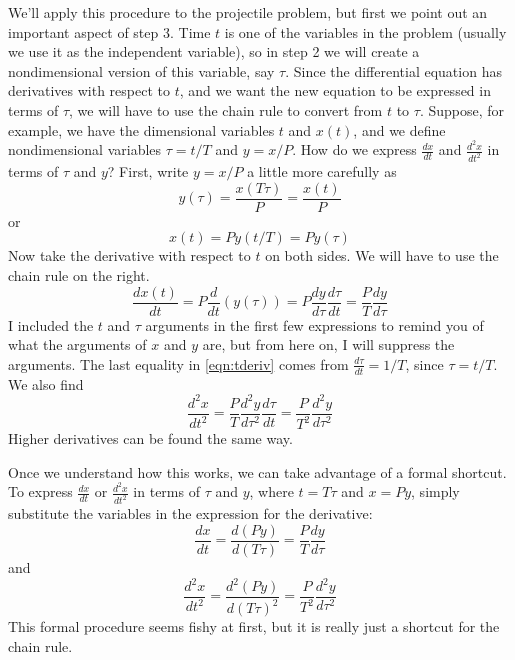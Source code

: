 We'll apply this procedure to the projectile problem,
but first we point out an important aspect of
step 3.
Time $t$ is one of the variables in the
problem (usually we use it as the independent
variable), so in step 2 we will create a nondimensional
version of this variable, say $\tau$.
Since the differential equation has derivatives
with respect to $t$, and we want the new equation
to be expressed in terms of $\tau$, we will have
to use the chain rule to convert from $t$ to
$\tau$. Suppose, for example, we have the dimensional variables
$t$ and $x(t)$, and we define nondimensional
variables $\tau = t/T$ and $y=x/P$.  How do we
express $\frac{dx}{dt}$ and $\frac{d^2x}{dt^2}$
in terms of $\tau$ and $y$?  First, write $y=x/P$
a little more carefully as
\begin{equation}
   y(\tau) = \frac{x(T\tau)}{P} = \frac{x(t)}{P} 
\end{equation}
or
\begin{equation}
  x(t) = Py(t/T) = Py(\tau)
\end{equation}
Now take the derivative with respect to $t$ on both sides.
We will have to use the chain rule on the right.
\begin{equation}
  \frac{dx(t)}{dt} = P \frac{d}{dt}\left(y(\tau)\right)= P \frac{dy}{d\tau} \frac{d\tau}{dt}
      = \frac{P}{T}\frac{dy}{d\tau}
  \label{eqn:tderiv}
\end{equation}
I included the $t$ and $\tau$ arguments in the first few expressions
to remind you of what the arguments of $x$ and $y$ are, but from here
on, I will suppress the arguments.
The last equality in \eqref{eqn:tderiv}
comes from $\frac{d\tau}{dt} = 1/T$, since $\tau = t/T$.
We also find
\begin{equation}
  \frac{d^2x}{dt^2} = \frac{P}{T} \frac{d^2y}{d\tau^2}\frac{d\tau}{dt}
     = \frac{P}{T^2}\frac{d^2y}{d\tau^2}
\end{equation}
Higher derivatives can be found the same way.

Once we understand how this works, we can take advantage of a formal
shortcut.  To express $\frac{dx}{dt}$ or $\frac{d^2x}{dt^2}$
in terms of $\tau$ and $y$, where $t = T\tau$ and $x = Py$, simply
substitute the variables in the expression for the derivative:
\begin{equation}
   \frac{dx}{dt} = \frac{d (Py)}{d(T\tau)} = \frac{P}{T}\frac{dy}{d\tau}
\end{equation}
and
\begin{equation}
   \frac{d^2x}{dt^2} = \frac{d^2(Py)}{d(T\tau)^2}
      = \frac{P}{T^2}\frac{d^2y}{d\tau^2}
\end{equation}
This formal procedure seems fishy at first, but it is really just
a shortcut for the chain rule.

